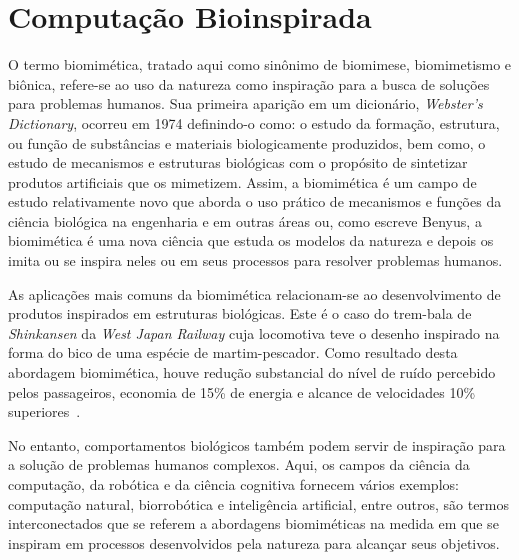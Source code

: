 \chapter{Computação Bioinspirada}


O termo biomimética, tratado aqui como sinônimo de biomimese, biomimetismo e biônica, refere-se ao uso da natureza como inspiração para a busca de soluções para problemas humanos. Sua primeira aparição em um dicionário, \textit{Webster's Dictionary}, ocorreu em 1974 definindo-o como:  o estudo da formação, estrutura, ou função de substâncias e materiais biologicamente produzidos, bem como, o estudo de mecanismos e estruturas biológicas com o propósito de sintetizar produtos artificiais que os mimetizem. Assim, a biomimética é um campo de estudo relativamente novo que aborda o uso prático de mecanismos e funções da ciência biológica na engenharia e em outras áreas\cite{vincent06} ou, como escreve Benyus\cite{benyus03}, a biomimética é uma nova ciência que estuda os modelos da natureza e depois os imita ou se inspira neles ou em seus processos para resolver problemas humanos.

As aplicações mais comuns da biomimética relacionam-se ao desenvolvimento de produtos inspirados em estruturas biológicas. Este é o caso do trem-bala de \textit{Shinkansen} da \textit{West Japan Railway} cuja locomotiva teve o desenho inspirado na forma do bico de uma espécie de martim-pescador. Como resultado desta abordagem biomimética, houve redução substancial do nível de ruído percebido pelos passageiros, economia de 15\% de energia e alcance de velocidades 10\% superiores~\cite{biomimicry01}.

No entanto, comportamentos biológicos também podem servir de inspiração para a solução de problemas humanos complexos. Aqui, os campos da ciência da computação, da robótica e da ciência cognitiva fornecem vários exemplos: computação natural\cite{decastro06}, biorrobótica\cite{webb01} e inteligência artificial\cite{mccarthy55}, entre outros, são termos interconectados que se referem a abordagens biomiméticas na medida em que se inspiram em processos desenvolvidos pela natureza para alcançar seus objetivos.


